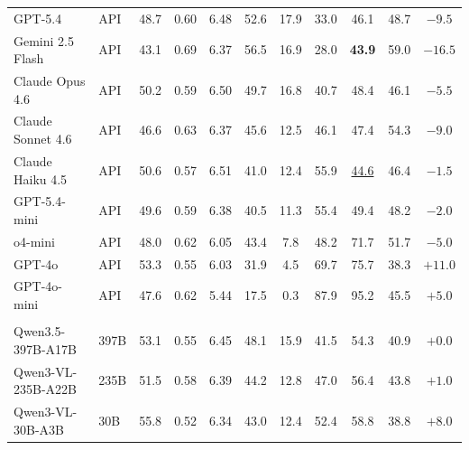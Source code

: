 \documentclass{article}
\newcommand{\opengroup}[1]{\rowcolor{groupred}\multicolumn{#1}{l}{\hspace{-0.3em}\textit{\textbf{Open-source Models}}}}
\newcommand{\best}[1]{\textbf{#1}}
\newcommand{\second}[1]{\underline{#1}}
\begin{document}
\begin{table}[t]
{\begin{tabular}{l@{\hspace{0.4em}}l@{\hspace{1.0em}}cccc@{\hspace{1.0em}}cccc@{\hspace{1.0em}}c}
GPT-5.4~\cite{openai2025gpt54}               & API & 48.7          & 0.60        & 6.48          & 52.6         & 17.9          & 33.0          & 46.1          & 48.7          & $-9.5$  \\
Gemini 2.5 Flash~\cite{comanici2025gemini}   & API & 43.1          & 0.69        & 6.37          & 56.5         & 16.9          & 28.0          & \best{43.9}   & 59.0          & $-16.5$ \\
Claude Opus 4.6~\cite{anthropic2025claudeopus46}     & API & 50.2          & 0.59        & 6.50          & 49.7         & 16.8          & 40.7          & 48.4          & 46.1          & $-5.5$  \\
Claude Sonnet 4.6~\cite{anthropic2025claudesonnet46} & API & 46.6          & 0.63        & 6.37          & 45.6         & 12.5          & 46.1          & 47.4          & 54.3          & $-9.0$  \\
Claude Haiku 4.5~\cite{anthropic2025claudehaiku45}   & API & 50.6          & 0.57        & 6.51          & 41.0         & 12.4          & 55.9          & \second{44.6} & 46.4          & $-1.5$  \\
GPT-5.4-mini~\cite{openai2025gpt54mini}      & API & 49.6          & 0.59        & 6.38          & 40.5         & 11.3          & 55.4          & 49.4          & 48.2          & $-2.0$  \\
o4-mini~\cite{openai2025o4mini}              & API & 48.0          & 0.62        & 6.05          & 43.4         &  7.8          & 48.2          & 71.7          & 51.7          & $-5.0$  \\
GPT-4o~\cite{openai2024gpt4o}                & API & 53.3          & 0.55        & 6.03          & 31.9         &  4.5          & 69.7          & 75.7          & 38.3          & $+11.0$ \\
GPT-4o-mini~\cite{openai2024gpt4o}           & API & 47.6          & 0.62        & 5.44          & 17.5         &  0.3          & 87.9          & 95.2          & 45.5          & $+5.0$  \\
\midrule
\opengroup{11} \\
Qwen3.5-397B-A17B~\cite{qwen2025qwen3}      & 397B & 53.1 & 0.55 & 6.45 & 48.1 & 15.9 & 41.5          & 54.3          & 40.9        & $+0.0$  \\
Qwen3-VL-235B-A22B~\cite{bai2025qwen25vl}   & 235B & 51.5 & 0.58 & 6.39 & 44.2 & 12.8 & 47.0          & 56.4          & 43.8        & $+1.0$  \\
Qwen3-VL-30B-A3B~\cite{bai2025qwen25vl}     & 30B  & 55.8 & 0.52 & 6.34 & 43.0 & 12.4 & 52.4          & 58.8          & 38.8        & $+8.0$  \\

\end{tabular}}
\end{table}
\end{document}
